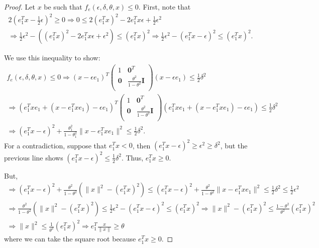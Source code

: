 \documentclass{article}
\theoremstyle{case}
\begin{document}
\begin{proof}
Let $x$ be such that $f_e(\epsilon, \delta, \theta, x) \le 0$.
First, note that
\begin{align*}
2(e_1^Tx - \frac 1 2 \epsilon )^2\ge 0
\Longrightarrow 0 \le 2(e_1^Tx)^2 - 2e_1^Tx\epsilon + \frac 1 2 \epsilon^2 \\
\Longrightarrow \frac 1 2 \epsilon^2 - \left((e_1^Tx)^2 - 2e_1^Tx\epsilon + \epsilon^2\right) \le (e_1^Tx)^2
\Longrightarrow \frac 1 2 \epsilon^2 - (e_1^Tx - \epsilon)^2 \le (e_1^Tx)^2.
\end{align*}

We use this inequality to show:
\begin{align*}
f_e(\epsilon, \delta, \theta, x) \le 0
\Longrightarrow (x - \epsilon e_1)^T\begin{pmatrix}
1 & \boldsymbol0^T \\
\boldsymbol 0 & \frac{\theta^2}{1 - \theta^2} \boldsymbol I \\
\end{pmatrix}(x - \epsilon e_1) \le \frac 1 2 \delta^2 \\
\Longrightarrow (e_1^Txe_1 + (x - e_1^Txe_1) - \epsilon e_1)^T\begin{pmatrix}
1 & \boldsymbol0^T \\
\boldsymbol 0 & \frac{\theta^2}{1 - \theta^2} \boldsymbol I \\
\end{pmatrix}(e_1^Txe_1 + (x - e_1^Txe_1) - \epsilon e_1) \le \frac 1 2 \delta^2 \\
\Longrightarrow 
(e_1^Tx - \epsilon)^2 + \frac{\theta_1^2}{1 - \theta_1^2}\|x - e_1^Tx e_1\|^2 \le \frac 1 2 \delta^2.
\end{align*}
For a contradiction, suppose that $e_1^Tx < 0$, then $(e_1^Tx - \epsilon)^2 \ge \epsilon^2 \ge \delta^2$, but the previous line shows $(e_1^Tx - \epsilon)^2 \le \frac 1 2 \delta^2$.
Thus, $e_1^Tx \ge 0$.

But,
\begin{align*}
\Longrightarrow
(e_1^Tx - \epsilon)^2 + \frac{\theta^2}{1 - \theta^2}\left(\|x\|^2 - (e_1^Tx)^2\right) 
\le (e_1^Tx - \epsilon)^2 + \frac{\theta^2}{1 - \theta^2}\|x - e_1^Tx e_1\|^2 \le \frac 1 2 \delta^2 \le \frac 1 2 \epsilon^2 \\
\Longrightarrow \frac{\theta^2}{1 - \theta^2}(\|x\|^2 - (e_1^Tx)^2) \le \frac 1 2 \epsilon^2 - (e_1^Tx - \epsilon)^2 \le (e_1^Tx)^2
\Longrightarrow \|x\|^2 - (e_1^Tx)^2 \le \frac{1 - \theta^2}{\theta^2}(e_1^Tx)^2 \\
\Longrightarrow \|x\|^2 \le \frac 1 {\theta^2}(e_1^Tx)^2
\Longrightarrow e_1^T\frac{x}{\|x\|} \ge \theta
\end{align*}
where we can take the square root because $e_1^Tx \ge 0$.
\end{proof}
\end{document}
